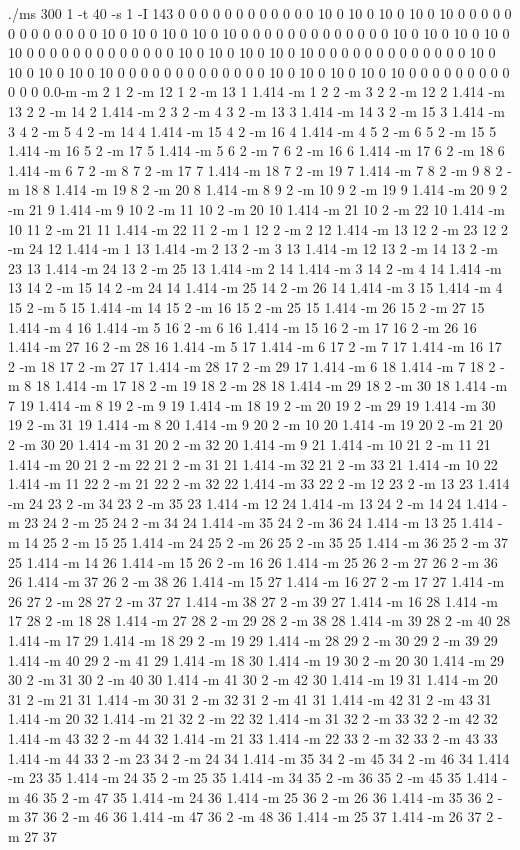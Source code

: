 \documentclass[12pt]{article}
\begin{document}
./ms 300 1 -t 40 -s 1 -I 143 0 0 0 0 0 0 0 0 0 0 0 0 10 0 10 0 10 0 10 0 10 0 0 0 0 0 0 0 0 0 0 0 0 0 10 0 10 0 10 0 10 0 10 0 0 0 0 0 0 0 0 0 0 0 0 0 10 0 10 0 10 0 10 0 10 0 0 0 0 0 0 0 0 0 0 0 0 0 10 0 10 0 10 0 10 0 10 0 0 0 0 0 0 0 0 0 0 0 0 0 10 0 10 0 10 0 10 0 10 0 0 0 0 0 0 0 0 0 0 0 0 0 10 0 10 0 10 0 10 0 10 0 0 0 0 0 0 0 0 0 0 0 0 0.0-m -m 2 1 2 -m 12 1 2 -m 13 1 1.414 -m 1 2 2 -m 3 2 2 -m 12 2 1.414 -m 13 2 2 -m 14 2 1.414 -m 2 3 2 -m 4 3 2 -m 13 3 1.414 -m 14 3 2 -m 15 3 1.414 -m 3 4 2 -m 5 4 2 -m 14 4 1.414 -m 15 4 2 -m 16 4 1.414 -m 4 5 2 -m 6 5 2 -m 15 5 1.414 -m 16 5 2 -m 17 5 1.414 -m 5 6 2 -m 7 6 2 -m 16 6 1.414 -m 17 6 2 -m 18 6 1.414 -m 6 7 2 -m 8 7 2 -m 17 7 1.414 -m 18 7 2 -m 19 7 1.414 -m 7 8 2 -m 9 8 2 -m 18 8 1.414 -m 19 8 2 -m 20 8 1.414 -m 8 9 2 -m 10 9 2 -m 19 9 1.414 -m 20 9 2 -m 21 9 1.414 -m 9 10 2 -m 11 10 2 -m 20 10 1.414 -m 21 10 2 -m 22 10 1.414 -m 10 11 2 -m 21 11 1.414 -m 22 11 2 -m 1 12 2 -m 2 12 1.414 -m 13 12 2 -m 23 12 2 -m 24 12 1.414 -m 1 13 1.414 -m 2 13 2 -m 3 13 1.414 -m 12 13 2 -m 14 13 2 -m 23 13 1.414 -m 24 13 2 -m 25 13 1.414 -m 2 14 1.414 -m 3 14 2 -m 4 14 1.414 -m 13 14 2 -m 15 14 2 -m 24 14 1.414 -m 25 14 2 -m 26 14 1.414 -m 3 15 1.414 -m 4 15 2 -m 5 15 1.414 -m 14 15 2 -m 16 15 2 -m 25 15 1.414 -m 26 15 2 -m 27 15 1.414 -m 4 16 1.414 -m 5 16 2 -m 6 16 1.414 -m 15 16 2 -m 17 16 2 -m 26 16 1.414 -m 27 16 2 -m 28 16 1.414 -m 5 17 1.414 -m 6 17 2 -m 7 17 1.414 -m 16 17 2 -m 18 17 2 -m 27 17 1.414 -m 28 17 2 -m 29 17 1.414 -m 6 18 1.414 -m 7 18 2 -m 8 18 1.414 -m 17 18 2 -m 19 18 2 -m 28 18 1.414 -m 29 18 2 -m 30 18 1.414 -m 7 19 1.414 -m 8 19 2 -m 9 19 1.414 -m 18 19 2 -m 20 19 2 -m 29 19 1.414 -m 30 19 2 -m 31 19 1.414 -m 8 20 1.414 -m 9 20 2 -m 10 20 1.414 -m 19 20 2 -m 21 20 2 -m 30 20 1.414 -m 31 20 2 -m 32 20 1.414 -m 9 21 1.414 -m 10 21 2 -m 11 21 1.414 -m 20 21 2 -m 22 21 2 -m 31 21 1.414 -m 32 21 2 -m 33 21 1.414 -m 10 22 1.414 -m 11 22 2 -m 21 22 2 -m 32 22 1.414 -m 33 22 2 -m 12 23 2 -m 13 23 1.414 -m 24 23 2 -m 34 23 2 -m 35 23 1.414 -m 12 24 1.414 -m 13 24 2 -m 14 24 1.414 -m 23 24 2 -m 25 24 2 -m 34 24 1.414 -m 35 24 2 -m 36 24 1.414 -m 13 25 1.414 -m 14 25 2 -m 15 25 1.414 -m 24 25 2 -m 26 25 2 -m 35 25 1.414 -m 36 25 2 -m 37 25 1.414 -m 14 26 1.414 -m 15 26 2 -m 16 26 1.414 -m 25 26 2 -m 27 26 2 -m 36 26 1.414 -m 37 26 2 -m 38 26 1.414 -m 15 27 1.414 -m 16 27 2 -m 17 27 1.414 -m 26 27 2 -m 28 27 2 -m 37 27 1.414 -m 38 27 2 -m 39 27 1.414 -m 16 28 1.414 -m 17 28 2 -m 18 28 1.414 -m 27 28 2 -m 29 28 2 -m 38 28 1.414 -m 39 28 2 -m 40 28 1.414 -m 17 29 1.414 -m 18 29 2 -m 19 29 1.414 -m 28 29 2 -m 30 29 2 -m 39 29 1.414 -m 40 29 2 -m 41 29 1.414 -m 18 30 1.414 -m 19 30 2 -m 20 30 1.414 -m 29 30 2 -m 31 30 2 -m 40 30 1.414 -m 41 30 2 -m 42 30 1.414 -m 19 31 1.414 -m 20 31 2 -m 21 31 1.414 -m 30 31 2 -m 32 31 2 -m 41 31 1.414 -m 42 31 2 -m 43 31 1.414 -m 20 32 1.414 -m 21 32 2 -m 22 32 1.414 -m 31 32 2 -m 33 32 2 -m 42 32 1.414 -m 43 32 2 -m 44 32 1.414 -m 21 33 1.414 -m 22 33 2 -m 32 33 2 -m 43 33 1.414 -m 44 33 2 -m 23 34 2 -m 24 34 1.414 -m 35 34 2 -m 45 34 2 -m 46 34 1.414 -m 23 35 1.414 -m 24 35 2 -m 25 35 1.414 -m 34 35 2 -m 36 35 2 -m 45 35 1.414 -m 46 35 2 -m 47 35 1.414 -m 24 36 1.414 -m 25 36 2 -m 26 36 1.414 -m 35 36 2 -m 37 36 2 -m 46 36 1.414 -m 47 36 2 -m 48 36 1.414 -m 25 37 1.414 -m 26 37 2 -m 27 37 
\end{document}

